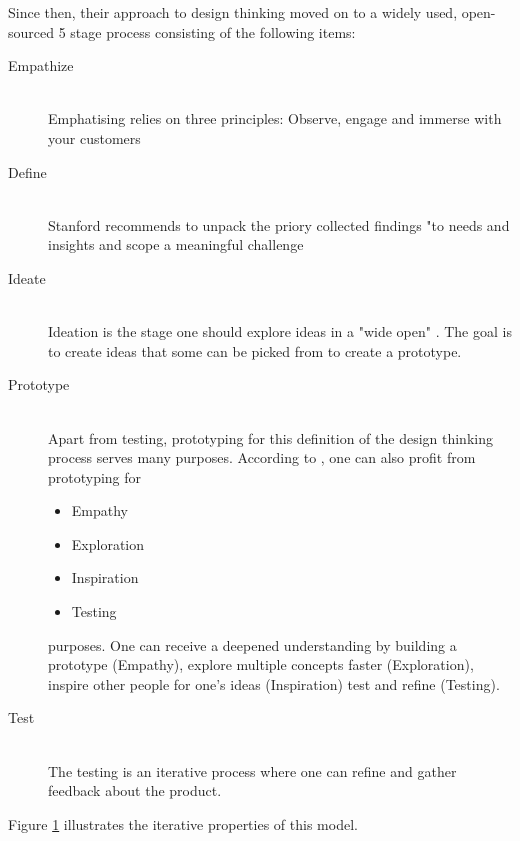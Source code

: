 Since then, their approach to design thinking moved on to a widely used, open-sourced 5 stage process \parencite{designThinkingCrashCourse}
consisting of the following items:
\begin{description}
    \item [Empathize] \hfill \\
    Emphatising relies on three principles: Observe, engage and immerse with your customers
    \item [Define] \hfill \\
    Stanford recommends to unpack the priory collected findings "to needs and insights and scope a meaningful challenge \parencite{designThinkingBootleg}
    \item [Ideate] \hfill \\
    Ideation is the stage one should explore ideas in a "wide open" \parencite{designThinkingBootleg}. The goal is to create ideas that some 
    can be picked from to create a prototype.
    \item [Prototype] \hfill \\
    Apart from testing, prototyping for this definition of the design thinking process serves many purposes. 
    According to \parencite{designThinkingBootleg}, one can also profit from prototyping for
    \begin{itemize}
        \item Empathy
        \item Exploration
        \item Inspiration
        \item Testing
    \end{itemize}
    purposes. One can receive a deepened understanding by building a prototype (Empathy), explore multiple concepts faster (Exploration),
    inspire other people for one's ideas (Inspiration) test and refine (Testing). 

    \item [Test] \hfill \\
    The testing is an iterative process where one can refine and gather feedback about the product.
\end{description}
Figure \ref{fig:designThinking} illustrates the iterative properties of this model.

\begin{figure}[h]
	\centering
	\caption[designThinking]{}
	\label{fig:designThinking}
  \end{figure}

